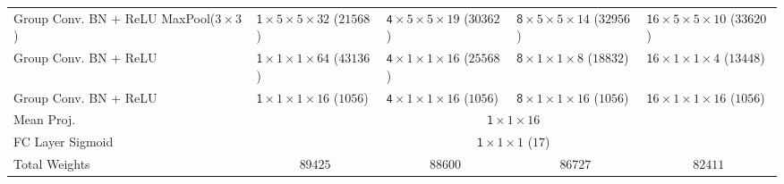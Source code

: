 \documentclass[twocolumn,final]{article}
\newcommand{\cellFormat}{\scriptsize \fontsize{7pt}{0pt}}
\newcommand{\shortTimes}{\! {\times} \!}
\newlength{\cellWidth}   \setlength{\cellWidth}{0.14\columnwidth}
\begin{document}
\begin{table}[ht!]
\begin{tabular}{p{} || p{\cellWidth}  p{\cellWidth} p{\cellWidth} p{\cellWidth}}
 \scriptsize \centering Group Conv. \newline BN + ReLU \newline MaxPool($3 \shortTimes 3$)
& \cellFormat $\mathsf 1 \shortTimes 5 \shortTimes 5 \shortTimes 32$  \newline ($21568$)
& \cellFormat $\mathsf 4 \shortTimes 5 \shortTimes 5 \shortTimes 19$  \newline ($30362$)
& \cellFormat $\mathsf 8 \shortTimes 5 \shortTimes 5 \shortTimes 14$  \newline ($32956$)
& \cellFormat $\mathsf 16 \shortTimes 5 \shortTimes 5 \shortTimes 10$ \newline ($33620$)
\\

 \scriptsize \centering Group Conv. \newline BN + ReLU
& \cellFormat $\mathsf 1 \shortTimes 1 \shortTimes 1 \shortTimes 64$  \newline ($43136$)
& \cellFormat $\mathsf 4 \shortTimes 1 \shortTimes 1 \shortTimes 16$  \newline ($25568$)
& \cellFormat $\mathsf 8 \shortTimes 1 \shortTimes 1 \shortTimes 8$   \newline ($18832$)
& \cellFormat $\mathsf 16 \shortTimes 1 \shortTimes 1 \shortTimes 4$  \newline ($13448$)
\\

\scriptsize \centering Group Conv. \newline BN + ReLU
& \cellFormat $\mathsf 1 \shortTimes 1 \shortTimes 1 \shortTimes 16$  \newline ($1056$)
& \cellFormat $\mathsf 4 \shortTimes 1 \shortTimes 1 \shortTimes 16$  \newline ($1056$)
& \cellFormat $\mathsf 8 \shortTimes 1 \shortTimes 1 \shortTimes 16$  \newline ($1056$)
& \cellFormat $\mathsf 16 \shortTimes 1 \shortTimes 1 \shortTimes 16$ \newline ($1056$)
\\

\scriptsize \centering Mean Proj.
& \multicolumn{4}{c}{ \cellFormat $\mathsf 1 \shortTimes 1 \shortTimes 16$ }
\\

\scriptsize \centering FC Layer \newline Sigmoid 
& \multicolumn{4}{c}{ \cellFormat $\mathsf 1 \shortTimes 1 \shortTimes 1$ ($17$) }
\\\hline

\scriptsize \centering Total \newline Weights
& \multicolumn{1}{c}{ \scriptsize $89425$}
& \multicolumn{1}{c}{ \scriptsize $88600$ }
& \multicolumn{1}{c}{ \scriptsize $86727$ }
& \multicolumn{1}{c}{ \scriptsize $82411$ }

\end{tabular}
\label{tab:pcamArchitecture} 
\end{table}
\end{document}
